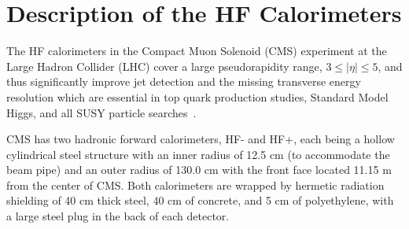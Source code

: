 \section{Description of the HF Calorimeters}

The HF calorimeters in the Compact Muon Solenoid (CMS)
experiment at the Large Hadron Collider (LHC) cover a large pseudorapidity
range, $3 \le |\eta| \le 5$, and thus significantly improve jet detection and the missing transverse energy resolution which are essential in top quark production studies, Standard Model Higgs, and all SUSY particle searches~\cite{CMSTP:1994,CMSTP:1997}.

CMS has two hadronic forward calorimeters, HF- and HF+, each being a hollow cylindrical steel structure with an inner radius of 12.5 cm (to accommodate the beam pipe) and an outer radius of 130.0 cm with the front face located 11.15 m from the center of CMS. Both calorimeters are wrapped by hermetic radiation shielding of 40 cm thick steel, 40 cm of concrete, and 5 cm of polyethylene, with a large steel plug in the back of each detector.

